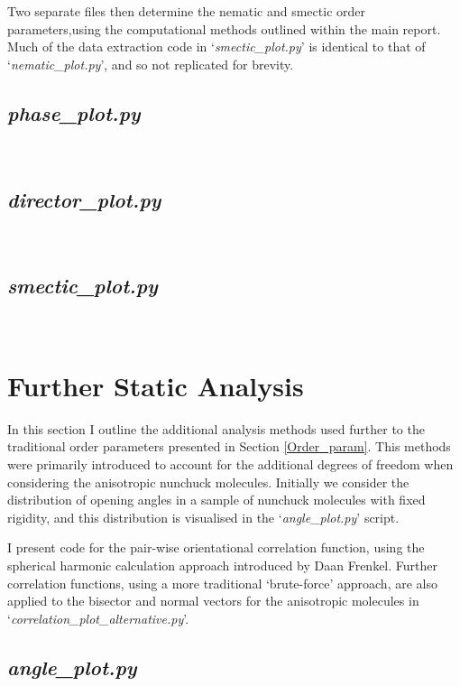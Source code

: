 \documentclass[11pt,a4paper]{article}
\begin{document}
Two separate files then determine the nematic and smectic order parameters,using the computational methods outlined within the main report. Much of the data extraction code in `\textit{smectic\_plot.py}' is identical to that of `\textit{nematic\_plot.py}', and so not replicated for brevity.

\subsection{\textit{phase\_plot.py}}
 \mbox{}\\

\subsection{\textit{director\_plot.py}}
 \mbox{}\\

\subsection{\textit{smectic\_plot.py}}
 \mbox{}\\

\section{Further Static Analysis} \label{Further_Analysis}
In this section I outline the additional analysis methods used further to the traditional order parameters presented in Section \ref{Order_param}. This methods were primarily introduced to account for the additional degrees of freedom when considering the anisotropic nunchuck molecules. Initially we consider the distribution of opening angles in a sample of nunchuck molecules with fixed rigidity, and this distribution is visualised in the `\textit{angle\_plot.py}' script.

I present code for the pair-wise orientational correlation function, using the spherical harmonic calculation approach introduced by Daan Frenkel. Further correlation functions, using a more traditional `brute-force' approach, are also applied to the bisector and normal vectors for the anisotropic molecules in `\textit{correlation\_plot\_alternative.py}'. 

\subsection{\textit{angle\_plot.py}}
 \mbox{}\\
\end{document}
